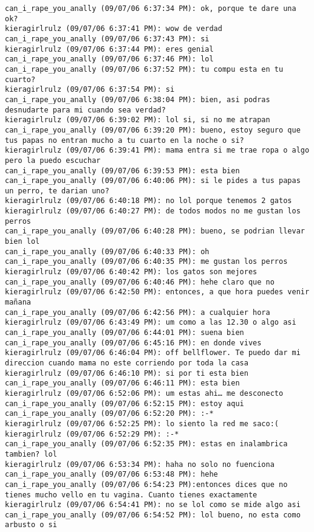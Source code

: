 \begin{verbatim}
can_i_rape_you_anally (09/07/06 6:37:34 PM): ok, porque te dare una ok?
kieragirlrulz (09/07/06 6:37:41 PM): wow de verdad
can_i_rape_you_anally (09/07/06 6:37:43 PM): si
kieragirlrulz (09/07/06 6:37:44 PM): eres genial
can_i_rape_you_anally (09/07/06 6:37:46 PM): lol
can_i_rape_you_anally (09/07/06 6:37:52 PM): tu compu esta en tu cuarto?
kieragirlrulz (09/07/06 6:37:54 PM): si
can_i_rape_you_anally (09/07/06 6:38:04 PM): bien, asi podras desnudarte para mi cuando sea verdad?
kieragirlrulz (09/07/06 6:39:02 PM): lol si, si no me atrapan
can_i_rape_you_anally (09/07/06 6:39:20 PM): bueno, estoy seguro que tus papas no entran mucho a tu cuarto en la noche o si?
kieragirlrulz (09/07/06 6:39:41 PM): mama entra si me trae ropa o algo pero la puedo escuchar 
can_i_rape_you_anally (09/07/06 6:39:53 PM): esta bien
can_i_rape_you_anally (09/07/06 6:40:06 PM): si le pides a tus papas un perro, te darian uno?
kieragirlrulz (09/07/06 6:40:18 PM): no lol porque tenemos 2 gatos
kieragirlrulz (09/07/06 6:40:27 PM): de todos modos no me gustan los perros
can_i_rape_you_anally (09/07/06 6:40:28 PM): bueno, se podrian llevar bien lol
can_i_rape_you_anally (09/07/06 6:40:33 PM): oh
can_i_rape_you_anally (09/07/06 6:40:35 PM): me gustan los perros
kieragirlrulz (09/07/06 6:40:42 PM): los gatos son mejores
can_i_rape_you_anally (09/07/06 6:40:46 PM): hehe claro que no
kieragirlrulz (09/07/06 6:42:50 PM): entonces, a que hora puedes venir mañana 
can_i_rape_you_anally (09/07/06 6:42:56 PM): a cualquier hora
kieragirlrulz (09/07/06 6:43:49 PM): um como a las 12.30 o algo asi
can_i_rape_you_anally (09/07/06 6:44:01 PM): suena bien
can_i_rape_you_anally (09/07/06 6:45:16 PM): en donde vives
kieragirlrulz (09/07/06 6:46:04 PM): off bellflower. Te puedo dar mi direccion cuando mama no este corriendo por toda la casa  
kieragirlrulz (09/07/06 6:46:10 PM): si por ti esta bien
can_i_rape_you_anally (09/07/06 6:46:11 PM): esta bien
kieragirlrulz (09/07/06 6:52:06 PM): um estas ahi… me desconecto
can_i_rape_you_anally (09/07/06 6:52:15 PM): estoy aqui
can_i_rape_you_anally (09/07/06 6:52:20 PM): :-*
kieragirlrulz (09/07/06 6:52:25 PM): lo siento la red me saco:( 
kieragirlrulz (09/07/06 6:52:29 PM): :-*
can_i_rape_you_anally (09/07/06 6:52:35 PM): estas en inalambrica tambien? lol
kieragirlrulz (09/07/06 6:53:34 PM): haha no solo no fuenciona
can_i_rape_you_anally (09/07/06 6:53:48 PM): hehe
can_i_rape_you_anally (09/07/06 6:54:23 PM):entonces dices que no tienes mucho vello en tu vagina. Cuanto tienes exactamente
kieragirlrulz (09/07/06 6:54:41 PM): no se lol como se mide algo asi 
can_i_rape_you_anally (09/07/06 6:54:52 PM): lol bueno, no esta como arbusto o si 

\end{verbatim}
